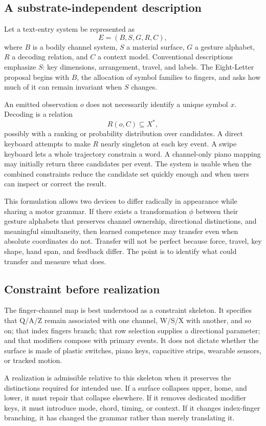 \documentclass[11pt]{article}
\begin{document}
\subsection{A substrate-independent description}

Let a text-entry system be represented as
\[
E=(B,S,G,R,C),
\]
where $B$ is a bodily channel system, $S$ a material surface, $G$ a gesture alphabet, $R$ a decoding relation, and $C$ a context model. Conventional descriptions emphasize $S$: key dimensions, arrangement, travel, and labels. The Eight-Letter proposal begins with $B$, the allocation of symbol families to fingers, and asks how much of it can remain invariant when $S$ changes.

An emitted observation $o$ does not necessarily identify a unique symbol $x$. Decoding is a relation
\[
R(o,C)\subseteq X^*,
\]
possibly with a ranking or probability distribution over candidates. A direct keyboard attempts to make $R$ nearly singleton at each key event. A swipe keyboard lets a whole trajectory constrain a word. A channel-only piano mapping may initially return three candidates per event. The system is usable when the combined constraints reduce the candidate set quickly enough and when users can inspect or correct the result.

This formulation allows two devices to differ radically in appearance while sharing a motor grammar. If there exists a transformation $\phi$ between their gesture alphabets that preserves channel ownership, directional distinctions, and meaningful simultaneity, then learned competence may transfer even when absolute coordinates do not. Transfer will not be perfect because force, travel, key shape, hand span, and feedback differ. The point is to identify what could transfer and measure what does.

\subsection{Constraint before realization}

The finger-channel map is best understood as a constraint skeleton. It specifies that Q/A/Z remain associated with one channel, W/S/X with another, and so on; that index fingers branch; that row selection supplies a directional parameter; and that modifiers compose with primary events. It does not dictate whether the surface is made of plastic switches, piano keys, capacitive strips, wearable sensors, or tracked motion.

A realization is admissible relative to this skeleton when it preserves the distinctions required for intended use. If a surface collapses upper, home, and lower, it must repair that collapse elsewhere. If it removes dedicated modifier keys, it must introduce mode, chord, timing, or context. If it changes index-finger branching, it has changed the grammar rather than merely translating it.
\end{document}

